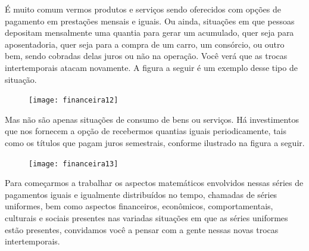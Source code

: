\label{fin-exp-5}

É muito comum vermos produtos e serviços sendo oferecidos com opções de pagamento em prestações mensais e iguais. Ou ainda, situações em que pessoas depositam mensalmente uma quantia para gerar um acumulado, quer seja para aposentadoria, quer seja para a compra de um carro, um consórcio, ou outro bem, sendo cobradas delas juros ou não na operação. Você verá que as trocas intertemporais atacam novamente. A figura a seguir é um exemplo desse tipo de situação.

\begin{figure}[H]
\centering

\texttt{[image: financeira12]}
\end{figure}

Mas não são apenas situações de consumo de bens ou serviços. Há investimentos que nos fornecem a opção de recebermos quantias iguais periodicamente, tais como os títulos que pagam juros semestrais, conforme ilustrado na figura a seguir.

\begin{figure}[H]
\centering

\texttt{[image: financeira13]}
\end{figure}

Para começarmos a trabalhar os aspectos matemáticos envolvidos nessas séries de pagamentos iguais e igualmente distribuídos no tempo, chamadas de séries uniformes, bem como aspectos financeiros, econômicos, comportamentais, culturais e sociais presentes nas variadas situações em que as séries uniformes estão presentes, convidamos você a pensar com a gente nessas novas trocas intertemporais.

